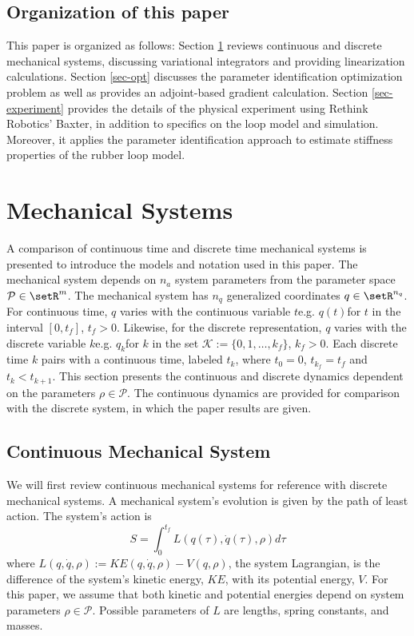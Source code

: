 \documentclass[letterpaper, 10pt, conference]{ieeeconf}
\begin{document}
\subsection{Organization of this paper}
This paper is organized as follows: Section \ref{sec-sys} reviews continuous and discrete mechanical systems, discussing variational integrators and providing linearization calculations.  Section \ref{sec-opt} discusses the parameter identification optimization problem as well as provides an adjoint-based gradient calculation.  Section \ref{sec-experiment} provides the details of the physical experiment using Rethink Robotics' Baxter, in addition to specifics on the loop model and simulation.  Moreover, it applies the parameter identification approach to estimate stiffness properties of the rubber loop model.

\section{Mechanical Systems}
\label{sec-sys}
A comparison of continuous time and discrete time mechanical systems is presented to introduce the models and notation used in this paper.  The mechanical system depends on $n_a$ system parameters from the parameter space $\mathcal{P}\in\setR^m$. The mechanical system has $n_q$ generalized coordinates $q\in\setR^{n_q}$.  For continuous time, $q$ varies with the continuous variable $t$\textemdash e.g. $q(t)$\textemdash for $t$ in the interval $[0,t_f]$, $t_f>0$.  Likewise, for the discrete representation, $q$ varies with the discrete variable $k$\textemdash e.g. $q_k$\textemdash for $k$ in the set $\mathcal{K}:=\{0,1,\ldots,k_f\}$, $k_f>0$.  Each discrete time $k$ pairs with a continuous time, labeled $t_k$, where $t_0 = 0$, $t_{k_f} = t_f$ and $t_k<t_{k+1}$. This section presents the continuous and discrete dynamics dependent on the parameters $\rho\in\mathcal{P}$.  The continuous dynamics are provided for comparison with the discrete system, in which the paper results are given.

\subsection{Continuous Mechanical System}
We will first review continuous mechanical systems for reference with discrete mechanical systems.  A mechanical system's evolution is given by the path of least action.  The system's action is 
\[
S = \int_0^{t_f}L(q(\tau),\dot{q}(\tau),\rho)d\tau
\]
where $L(q,\dot{q},\rho) := KE(q,\dot{q},\rho) - V(q,\rho)$, the system Lagrangian, is the difference of the system's kinetic energy, $KE$, with its potential energy, $V$.  For this paper, we assume that both kinetic and potential energies depend on system parameters $\rho\in\mathcal{P}$.  Possible parameters of $L$ are lengths, spring constants, and masses. 
\end{document}
